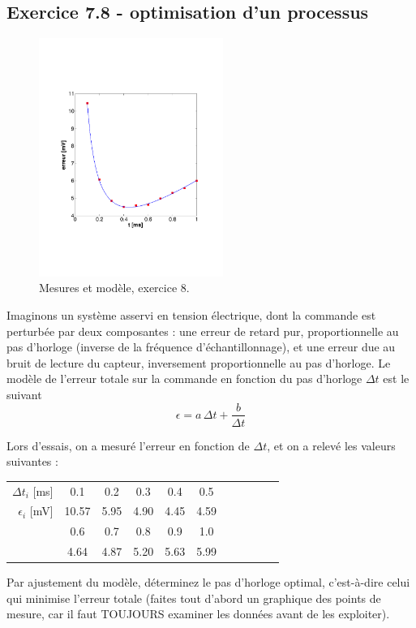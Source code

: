 \documentclass[main.tex]{subfiles}
\begin{document}
\subsection*{Exercice 7.8 - optimisation d'un processus}

\begin{figure}
    \centering
    \vspace{-5mm}
    \includegraphics[width=6cm]{assets/figures/exe9fig1serie2.pdf}
    \caption{Mesures et modèle, exercice 8.}
    \label{fig:exe9}
\end{figure}
Imaginons un système asservi en tension électrique, dont la commande est perturbée par deux composantes : une erreur de retard pur, proportionnelle au pas d'horloge (inverse de la fréquence d'échantillonnage), et une erreur due au bruit de lecture du capteur, inversement proportionnelle au pas d'horloge. Le modèle de l'erreur totale sur la commande en fonction du pas d'horloge $\Delta t$ est le suivant
$$
    \epsilon=a\,\Delta t+\frac{b}{\Delta t}
$$
\newline
\newline
\newline
\newline
\newline

Lors d'essais, on a mesuré l'erreur en fonction de $\Delta t$, et on a relevé les valeurs suivantes :
\begin{center}
    \hspace{6cm}\begin{tabular}{r|cccccccccc}
        $\Delta t_i$ [ms] & 0.1   & 0.2  & 0.3  & 0.4  & 0.5  \\
        $\epsilon_i$ [mV] & 10.57 & 5.95 & 4.90 & 4.45 & 4.59 \\
                          & 0.6   & 0.7  & 0.8  & 0.9  & 1.0  \\
                          & 4.64  & 4.87 & 5.20 & 5.63 & 5.99
    \end{tabular}
\end{center}

Par ajustement du modèle, déterminez le pas d'horloge optimal, c'est-à-dire celui qui minimise l'erreur totale (faites tout d'abord un graphique des points de mesure, car il faut TOUJOURS examiner les données avant de les exploiter).
\end{document}

